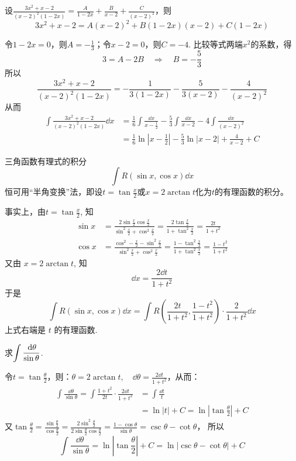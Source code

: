 \begin{solution}
设$\frac{3x^2+x-2}{(x-2)^2(1-2x)}=\frac{A}{1-2x}+\frac{B}{x-2}+\frac{C}{(x-2)^2}$，则
\[3x^2+x-2=A(x-2)^2+B(1-2x)(x-2)+C(1-2x)\]

令$1-2x=0$，则$A=-\frac{1}{3}$；令$x-2=0$，则$C=-4$. 比较等式两端$x^2$的系数，得
\[3=A-2B\quad\Rightarrow\quad B=-\frac{5}{3}\]
所以
\[\frac{3x^2+x-2}{(x-2)^2(1-2x)}=-\frac{1}{3(1-2x)}-\frac{5}{3(x-2)}-\frac{4}{(x-2)^2}\]
从而
\[\begin{split}
\int \frac{3x^2+x-2}{(x-2)^2(1-2x)}\dd x &=\frac{1}{6}\int \frac{\dd x}{x-\frac{1}{2}}-\frac{5}{3}\int \frac{\dd x}{x-2}-4\int \frac{\dd x}{(x-2)^2}\\
&=\frac{1}{6}\ln\left|x-\frac{1}{2}\right|-\frac{5}{3}\ln|x-2|+\frac{4}{x-2}+C
\end{split}\]
\end{solution}

三角函数有理式的积分
\[\int R (\sin x,\cos x) \dd x\]
恒可用“半角变换”法，即设$t=\tan\frac{x}{2}$或$x=2\arctan t$化为$t$的有理函数的积分。

事实上，由$t=\tan\frac{x}{2}$, 知
\[\begin{split}
\sin x&=\frac{2 \sin \frac{x}{2} \cos \frac{x}{2}}{\sin ^{2} \frac{x}{2}+\cos ^{2} \frac{x}{2}}=\frac{2 \tan \frac{x}{2}}{1+\tan^{2} \frac{x}{2}}=\frac{2 t}{1+t^{2}}\\
\cos x &=\frac{\cos ^{2}-\frac{x}{2}-\sin ^{2} \frac{x}{2}}{\sin ^{2} \frac{x}{2}+\cos ^{2} \frac{x}{2}}=\frac{1-\tan^{2} \frac{x}{2}}{1+\tan^{2} \frac{x}{2}} 
=\frac{1-t^{2}}{1+t^{2}}
\end{split}\]
又由 $x=2 \arctan t$, 知
\[\dd x=\frac{2 \dd t}{1+t^{2}}\]
于是
\[
\int R(\sin x,  \cos x) \dd x=\int R\left(\frac{2 t}{1+t^{2}}, \frac{1-t^{2}}{1+t^{2}}\right) \cdot \frac{2}{1+t^{2}} \dd x 
\]
上式右端是 $t$ 的有理函数.

\begin{example}
    求$\displaystyle\int \dfrac{\,{\rm d}\theta}{\sin\theta}$.
\end{example}

\begin{solution}
令$t=\tan\frac{\theta}{2}$，则：$\theta=2\arctan t,\quad \dd\theta=\frac{2\dd t}{1+t^2}$，从而：
\[\begin{split}
    \int\frac{\dd\theta}{\sin\theta}=\int\frac{1+t^2}{2t}\cdot \frac{2\dd t}{1+t^2}&=\int\frac{\dd t}{t}\\
    &=\ln|t|+C=\ln\left|\tan\frac{\theta}{2}\right|+C
\end{split}\]
又$\tan\frac{\theta}{2}=\frac{\sin\frac{\theta}{2}}{\cos\frac{\theta}{2}}=\frac{2\sin^2 \frac{\theta}{2}}{2\sin\frac{\theta}{2}\cos \frac{\theta}{2}}=\frac{1-\cos\theta}{\sin\theta}=\csc\theta-\cot\theta$，
所以
\[\int\frac{\dd\theta}{\sin\theta}=\ln\left|\tan\frac{\theta}{2}\right|+C=\ln|\csc\theta-\cot\theta|+C\]    
\end{solution}

